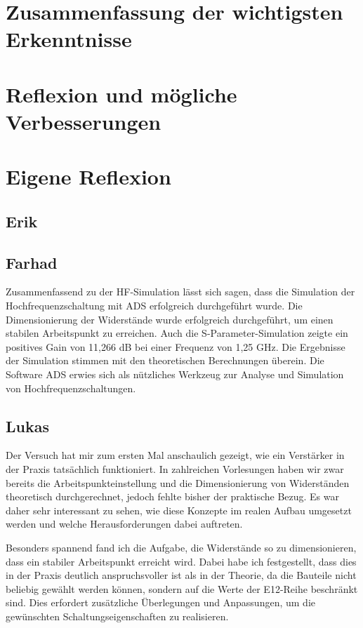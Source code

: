 
\section{Zusammenfassung der wichtigsten Erkenntnisse}
\section{Reflexion und mögliche Verbesserungen}
\section{Eigene Reflexion}
\subsection{Erik}
\subsection{Farhad}
Zusammenfassend zu der HF-Simulation lässt sich sagen, dass die Simulation der Hochfrequenzschaltung mit \ac{ADS} erfolgreich durchgeführt wurde. Die Dimensionierung der Widerstände wurde erfolgreich durchgeführt, um einen stabilen Arbeitspunkt zu erreichen. Auch die S-Parameter-Simulation zeigte ein positives Gain von 11,266 dB bei einer Frequenz von 1{,}25 GHz.
Die Ergebnisse der Simulation stimmen mit den theoretischen Berechnungen überein.
Die Software \ac{ADS} erwies sich als nützliches Werkzeug zur Analyse und Simulation von Hochfrequenzschaltungen.
\subsection{Lukas}
Der Versuch hat mir zum ersten Mal anschaulich gezeigt, wie ein Verstärker in der Praxis tatsächlich funktioniert. In zahlreichen Vorlesungen haben wir zwar bereits die Arbeitspunkteinstellung und die Dimensionierung von Widerständen theoretisch durchgerechnet, jedoch fehlte bisher der praktische Bezug. Es war daher sehr interessant zu sehen, wie diese Konzepte im realen Aufbau umgesetzt werden und welche Herausforderungen dabei auftreten.

Besonders spannend fand ich die Aufgabe, die Widerstände so zu dimensionieren, dass ein stabiler Arbeitspunkt erreicht wird. Dabei habe ich festgestellt, dass dies in der Praxis deutlich anspruchsvoller ist als in der Theorie, da die Bauteile nicht beliebig gewählt werden können, sondern auf die Werte der E12-Reihe beschränkt sind. Dies erfordert zusätzliche Überlegungen und Anpassungen, um die gewünschten Schaltungseigenschaften zu realisieren.


\clearpage